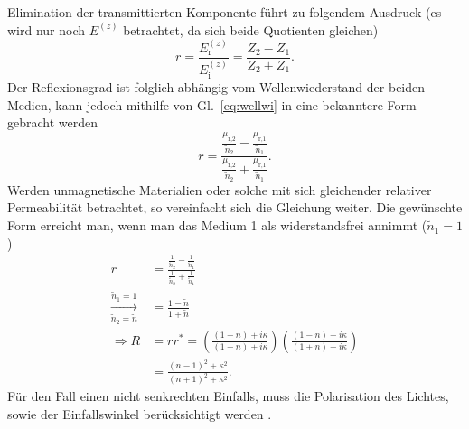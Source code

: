 Elimination der transmittierten Komponente führt zu folgendem Ausdruck
(es wird nur noch $E^{(z)}$ betrachtet, da sich beide Quotienten gleichen)
\begin{equation}
    r = \frac{E^{(z)}_{\text{r}}}{E^{(z)}_{\text{i}}} = \frac{Z_{2} - Z_{1}}{Z_{2} + Z_{1}}.
\end{equation}
Der Reflexionsgrad ist folglich abhängig vom Wellenwiederstand der beiden Medien, kann jedoch mithilfe
von Gl.~\eqref{eq:wellwi} in eine bekanntere Form gebracht werden
\begin{equation}
    r = \frac{\frac{\mu_{\text{r,}2}}{\tilde{n}_{2}} - \frac{\mu_{\text{r,}1}}{\tilde{n}_{1}}}{\frac{\mu_{\text{r,}2}}{\tilde{n}_{2}} + \frac{\mu_{\text{r,}1}}{\tilde{n}_{1}}}.
\end{equation}
Werden unmagnetische Materialien oder solche mit sich gleichender relativer Permeabilität betrachtet,
so vereinfacht sich die Gleichung weiter. Die gewünschte Form erreicht man, wenn man das Medium 1 als widerstandsfrei annimmt
($\tilde{n}_{1} = 1$)
\begin{align}
    r                                                      & = \frac{\frac{1}{\tilde{n}_{2}} - \frac{1}{\tilde{n}_{1}}}{\frac{1}{\tilde{n}_{2}} + \frac{1}{\tilde{n}_{1}}}               \\
    \xrightarrow[\tilde{n}_{2}=\tilde{n}]{\tilde{n}_{1}=1} & = \frac{1 - \tilde{n}}{1 + \tilde{n}}                                                                                       \\
    \Rightarrow R                                          & = rr^{*} = \left(\frac{(1 - n) + i\kappa}{(1 + n) + i\kappa}\right)\left(\frac{(1 - n) - i\kappa}{(1 + n) - i\kappa}\right) \\
                                                           & = \frac{(n-1)^{2} + \kappa^{2}}{(n+1)^{2} + \kappa^{2}}.
\end{align}
Für den Fall einen nicht senkrechten Einfalls, muss die Polarisation des Lichtes, sowie der Einfallswinkel
berücksichtigt werden \cite{gross,Gekle,Ulm}. \\
